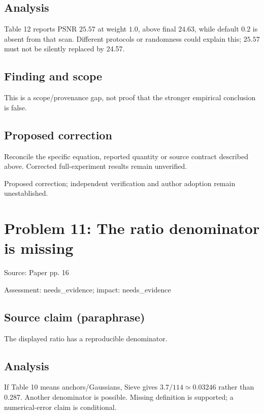 \documentclass[11pt]{article}
\begin{document}
\subsection*{Analysis}

Table 12 reports PSNR \(25.57\) at weight \(1.0\), above final \(24.63\), while default \(0.2\) is absent from that scan. Different protocols or randomness could explain this; \(25.57\) must not be silently replaced by 24.57.

\subsection*{Finding and scope}

This is a scope/provenance gap, not proof that the stronger empirical conclusion is false.

\subsection*{Proposed correction}

Reconcile the specific equation, reported quantity or source contract described above. Corrected full-experiment results remain unverified.

Proposed correction; independent verification and author adoption remain unestablished.

\section*{Problem 11: The ratio denominator is missing}

Source: Paper pp. 16

Assessment: needs\_evidence; impact: needs\_evidence

\subsection*{Source claim (paraphrase)}

The displayed ratio has a reproducible denominator.

\subsection*{Analysis}

If Table 10 means anchors/Gaussians, Sieve gives \(3.7/114\simeq0.03246\) rather than 0.287. Another denominator is possible. Missing definition is supported; a numerical-error claim is conditional.
\end{document}
